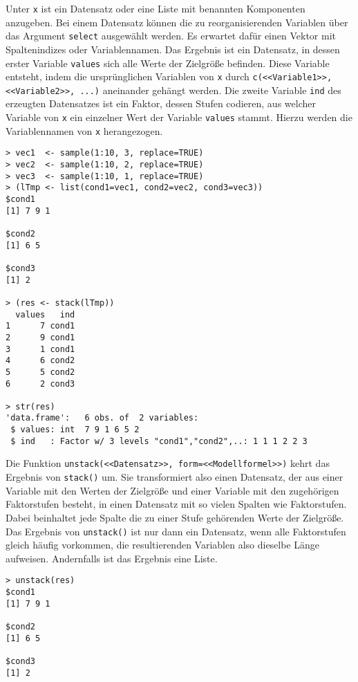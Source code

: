 Unter \lstinline!x! ist ein Datensatz oder eine Liste mit benannten Komponenten anzugeben. Bei einem Datensatz können die zu reorganisierenden Variablen über das Argument \lstinline!select! ausgewählt werden. Es erwartet dafür einen Vektor mit Spaltenindizes oder Variablennamen. Das Ergebnis ist ein Datensatz, in dessen erster Variable \lstinline!values! sich alle Werte der Zielgröße befinden. Diese Variable entsteht, indem die ursprünglichen Variablen von \lstinline!x! durch \lstinline!c(<<Variable1>>, <<Variable2>>, ...)! aneinander gehängt werden. Die zweite Variable \lstinline!ind! des erzeugten Datensatzes ist ein Faktor, dessen Stufen codieren, aus welcher Variable von \lstinline!x! ein einzelner Wert der Variable \lstinline!values! stammt. Hierzu werden die Variablennamen von \lstinline!x! herangezogen.
\begin{lstlisting}
> vec1  <- sample(1:10, 3, replace=TRUE)
> vec2  <- sample(1:10, 2, replace=TRUE)
> vec3  <- sample(1:10, 1, replace=TRUE)
> (lTmp <- list(cond1=vec1, cond2=vec2, cond3=vec3))
$cond1
[1] 7 9 1

$cond2
[1] 6 5

$cond3
[1] 2

> (res <- stack(lTmp))
  values   ind
1      7 cond1
2      9 cond1
3      1 cond1
4      6 cond2
5      5 cond2
6      2 cond3

> str(res)
'data.frame':	6 obs. of  2 variables:
 $ values: int  7 9 1 6 5 2
 $ ind   : Factor w/ 3 levels "cond1","cond2",..: 1 1 1 2 2 3
\end{lstlisting}

Die Funktion \lstinline!unstack(<<Datensatz>>, form=<<Modellformel>>)! kehrt das Ergebnis von \lstinline!stack()! um. Sie transformiert also einen Datensatz, der aus einer Variable mit den Werten der Zielgröße und einer Variable mit den zugehörigen Faktorstufen besteht, in einen Datensatz mit so vielen Spalten wie Faktorstufen. Dabei beinhaltet jede Spalte die zu einer Stufe gehörenden Werte der Zielgröße. Das Ergebnis von \lstinline!unstack()! ist nur dann ein Datensatz, wenn alle Faktorstufen gleich häufig vorkommen, die resultierenden Variablen also dieselbe Länge aufweisen. Andernfalls ist das Ergebnis eine Liste.
\begin{lstlisting}
> unstack(res)
$cond1
[1] 7 9 1

$cond2
[1] 6 5

$cond3
[1] 2
\end{lstlisting}

